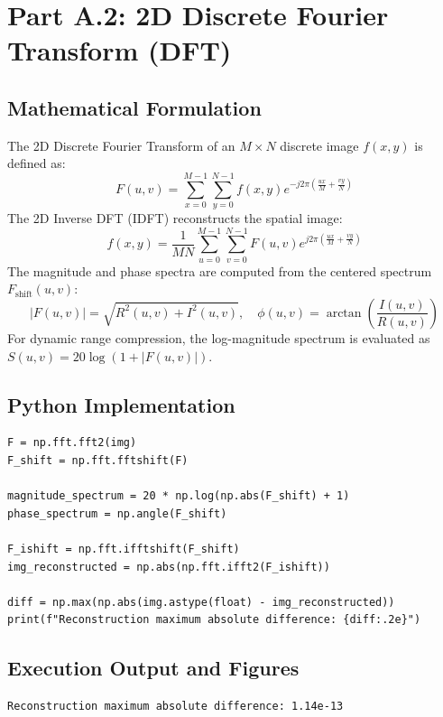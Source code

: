 \documentclass[12pt]{article}
\begin{document}
\section{Part A.2: 2D Discrete Fourier Transform (DFT)}

\subsection{Mathematical Formulation}
The 2D Discrete Fourier Transform of an $M \times N$ discrete image $f(x, y)$ is defined as:
\begin{equation}
    F(u, v) = \sum_{x=0}^{M-1} \sum_{y=0}^{N-1} f(x, y) e^{-j 2\pi \left(\frac{ux}{M} + \frac{vy}{N}\right)}
\end{equation}
The 2D Inverse DFT (IDFT) reconstructs the spatial image:
\begin{equation}
    f(x, y) = \frac{1}{MN} \sum_{u=0}^{M-1} \sum_{v=0}^{N-1} F(u, v) e^{j 2\pi \left(\frac{ux}{M} + \frac{vy}{N}\right)}
\end{equation}
The magnitude and phase spectra are computed from the centered spectrum $F_{\text{shift}}(u, v)$:
\begin{equation}
    |F(u, v)| = \sqrt{R^2(u, v) + I^2(u, v)}, \quad \phi(u, v) = \arctan\left(\frac{I(u, v)}{R(u, v)}\right)
\end{equation}
For dynamic range compression, the log-magnitude spectrum is evaluated as $S(u, v) = 20 \log(1 + |F(u, v)|)$.

\subsection{Python Implementation}
\begin{lstlisting}[style=code]
F = np.fft.fft2(img)
F_shift = np.fft.fftshift(F)

magnitude_spectrum = 20 * np.log(np.abs(F_shift) + 1)
phase_spectrum = np.angle(F_shift)

F_ishift = np.fft.ifftshift(F_shift)
img_reconstructed = np.abs(np.fft.ifft2(F_ishift))

diff = np.max(np.abs(img.astype(float) - img_reconstructed))
print(f"Reconstruction maximum absolute difference: {diff:.2e}")
\end{lstlisting}

\subsection{Execution Output and Figures}
\begin{lstlisting}[style=output]
Reconstruction maximum absolute difference: 1.14e-13
\end{lstlisting}
\end{document}
